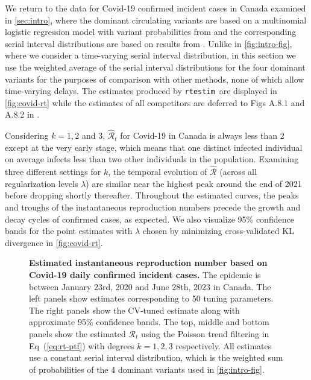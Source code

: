 \documentclass[10pt,letterpaper]{article}
\def\RtEstim{\texttt{rtestim}}
\def\calR{\mathcal{R}}
\renewcommand{\eqref}[1]{Eq~(\ref{#1})}
\begin{document}
We return to the data for Covid-19 confirmed incident cases in Canada examined
in \autoref{sec:intro}, where the dominant circulating variants are based on a
multinomial logistic regression model with variant probabilities from
\cite{duotang_2023} and the corresponding serial interval distributions are 
based on results from \cite{xu2023assessing}. Unlike in \autoref{fig:intro-fig}, where 
we consider a time-varying serial interval distribution, in this section we use the weighted average of the 
serial interval distributions for the four dominant variants for the purposes of comparison with other methods, none
of which allow time-varying delays. The estimates produced by \RtEstim\ are
displayed in \autoref{fig:covid-rt} while the estimates of all competitors are
deferred to Figs A.8.1 and A.8.2 in . 

Considering $k=1,2$ and 3, $\widehat{\calR}_t$ for Covid-19 in Canada is always
less than $2$ except at the very early stage, which means that one distinct
infected individual on average infects less than two other individuals in the
population. Examining three different settings for $k$, the temporal evolution
of $\widehat{\calR}$ (across all regularization levels $\lambda$) are similar
near the highest peak around the end of 2021 before dropping shortly thereafter.
Throughout the estimated curves, the peaks and troughs of the instantaneous
reproduction numbers precede the growth and decay cycles of confirmed cases, as
expected. We also visualize 95\% confidence bands for the point estimates with
$\lambda$ chosen by minimizing cross-validated KL divergence in
\autoref{fig:covid-rt}.     

\begin{figure}[!t]
  \centering
  \caption{{\bf Estimated instantaneous reproduction number based on Covid-19 daily
  confirmed incident cases.} The epidemic is between January 23rd, 2020 and June 28th, 2023 in
  Canada. The left panels show estimates corresponding to 50 tuning parameters.
  The right panels show the CV-tuned estimate along with approximate 95\%
  confidence bands. The top, middle and bottom panels show the estimated
  $\calR_t$ using the Poisson trend filtering in \eqref{eq:rt-ptf} with degrees
  $k=1,2,3$ respectively. All estimates use a constant serial interval
  distribution, which is the weighted sum of probabilities of the 4 dominant
  variants used in \autoref{fig:intro-fig}.}
  \label{fig:covid-rt}
\end{figure} 
\end{document}
